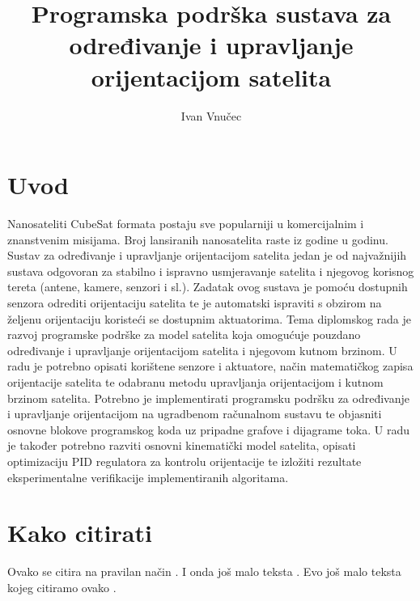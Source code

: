 \documentclass[times, utf8, diplomski, numeric]{templates/template}
\begin{document}

\title{Programska podrška sustava za određivanje i upravljanje orijentacijom satelita}


\author{Ivan Vnučec}

\maketitle

\izvornik


\tableofcontents

\chapter{Uvod}
Nanosateliti CubeSat formata postaju sve popularniji u komercijalnim i znanstvenim misijama. Broj lansiranih nanosatelita raste iz godine u godinu. Sustav za određivanje i upravljanje orijentacijom satelita jedan je od najvažnijih sustava odgovoran za stabilno i ispravno usmjeravanje satelita i njegovog korisnog tereta (antene, kamere, senzori i sl.). Zadatak ovog sustava je pomoću dostupnih senzora odrediti orijentaciju satelita te je automatski ispraviti s obzirom na željenu orijentaciju koristeći se dostupnim aktuatorima. Tema diplomskog rada je razvoj programske podrške za model satelita koja omogućuje pouzdano određivanje i upravljanje orijentacijom satelita i njegovom kutnom brzinom. U radu je potrebno opisati korištene senzore i aktuatore, način matematičkog zapisa orijentacije satelita te odabranu metodu upravljanja orijentacijom i kutnom brzinom satelita. Potrebno je implementirati programsku podršku za određivanje i upravljanje orijentacijom na ugradbenom računalnom sustavu te objasniti osnovne blokove programskog koda uz pripadne grafove i dijagrame toka. U radu je također potrebno razviti osnovni kinematički model satelita, opisati optimizaciju PID regulatora za kontrolu orijentacije te izložiti rezultate eksperimentalne verifikacije implementiranih algoritama.

\chapter{Kako citirati}
Ovako se citira na pravilan način \cite{oetiket2007lshort}. I onda još malo teksta \cite{downes2002shortams}. 
Evo još malo teksta kojeg citiramo ovako \cite{ungar2002uvod}.
\end{document}
